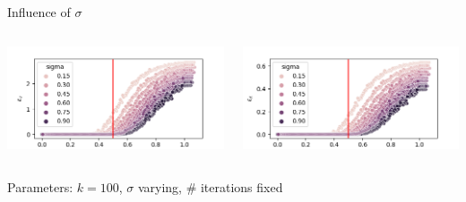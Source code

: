 \documentclass{beamer}
\begin{document}
\begin{frame}{Influence of $\sigma$}
	\begin{minipage}[0.95\textheight]{\textwidth}
	\begin{columns}[T]
	\begin{column}{0.50\textwidth}
	\includegraphics[width=\textwidth, keepaspectratio]{../images/N100_sigmaA.png}
	\end{column}
	\begin{column}{0.50\textwidth}
	\includegraphics[width=\textwidth, keepaspectratio]{../images/N100_sigmaAX.png}
	\end{column}
	\end{columns}
	\end{minipage}
	\begin{center}
		Parameters: $k=100$, $\sigma$ varying, \# iterations fixed
	\end{center}
\end{frame}
\end{document}
